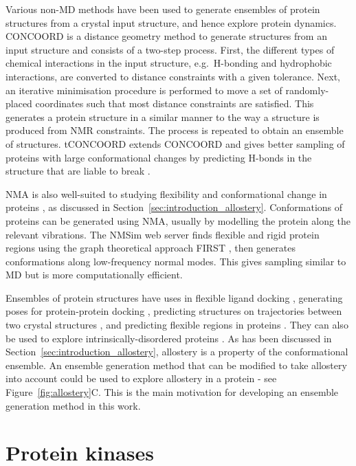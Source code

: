 Various non-MD methods have been used to generate ensembles of protein structures from a crystal input structure, and hence explore protein dynamics.
CONCOORD \cite{DeGroot1997, DeGroot1999} is a distance geometry method to generate structures from an input structure and consists of a two-step process.
First, the different types of chemical interactions in the input structure, e.g.\ H-bonding and hydrophobic interactions, are converted to distance constraints with a given tolerance.
Next, an iterative minimisation procedure is performed to move a set of randomly-placed coordinates such that most distance constraints are satisfied.
This generates a protein structure in a similar manner to the way a structure is produced from NMR constraints.
The process is repeated to obtain an ensemble of structures.
tCONCOORD extends CONCOORD and gives better sampling of proteins with large conformational changes by predicting H-bonds in the structure that are liable to break \cite{Seeliger2007}.

NMA is also well-suited to studying flexibility and conformational change in proteins \cite{Dobbins2008}, as discussed in Section~\ref{sec:introduction_allostery}.
Conformations of proteins can be generated using NMA, usually by modelling the protein along the relevant vibrations.
The NMSim web server \cite{Kruger2012, Ahmed2011} finds flexible and rigid protein regions using the graph theoretical approach FIRST \cite{Jacobs2001}, then generates conformations along low-frequency normal modes.
This gives sampling similar to MD but is more computationally efficient.

Ensembles of protein structures have uses in flexible ligand docking \cite{Totrov2008}, generating poses for protein-protein docking \cite{Mustard2005}, predicting structures on trajectories between two crystal structures \cite{Weiss2009}, and predicting flexible regions in proteins \cite{Ahmed2011}.
They can also be used to explore intrinsically-disordered proteins \cite{Tompa2012, Best2017}.
As has been discussed in Section~\ref{sec:introduction_allostery}, allostery is a property of the conformational ensemble.
An ensemble generation method that can be modified to take allostery into account could be used to explore allostery in a protein - see Figure~\ref{fig:allostery}C.
This is the main motivation for developing an ensemble generation method in this work.


\section{Protein kinases}
\label{sec:introduction_kinases}

